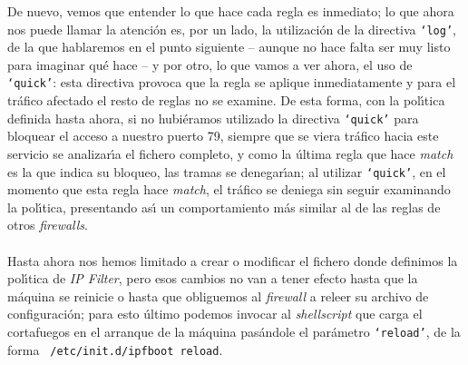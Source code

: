De nuevo, vemos que entender lo que hace cada regla es inmediato; lo que ahora
nos puede llamar la atenci\'on es, por un lado, la utilizaci\'on de la 
directiva {\tt `log'}, de la que hablaremos en el punto siguiente -- aunque no
hace falta ser muy listo para imaginar qu\'e hace -- y por otro, lo que vamos
a ver ahora, el uso de {\tt `quick'}: esta directiva provoca que la regla se
aplique inmediatamente y para el tr\'afico afectado el resto de reglas no se 
examine. De esta forma, con la pol\'{\i}tica definida hasta ahora, si no 
hubi\'eramos utilizado la directiva {\tt `quick'} para bloquear el acceso a 
nuestro puerto 79, siempre que se viera tr\'afico hacia este servicio se
analizar\'{\i}a el fichero completo, y como la \'ultima regla que hace {\it
match} es la que indica su bloqueo, las tramas se denegar\'{\i}an; al utilizar
{\tt `quick'}, en el momento que esta regla hace {\it match}, el tr\'afico se
deniega sin seguir examinando la pol\'{\i}tica, presentando as\'{\i} un 
comportamiento m\'as similar al de las reglas de otros {\it firewalls}.\\
\\Hasta ahora nos hemos limitado a crear o modificar el fichero donde definimos
la pol\'{\i}tica de {\it IP Filter}, pero esos cambios no van a tener efecto 
hasta que la m\'aquina se reinicie o hasta que obliguemos al {\it firewall} a
releer su archivo de configuraci\'on; para esto \'ultimo podemos invocar al
{\it shellscript} que carga el cortafuegos en el arranque de la m\'aquina 
pas\'andole el par\'ametro {\tt `reload'}, de la forma {\tt 
/etc/init.d/ipfboot reload}.
